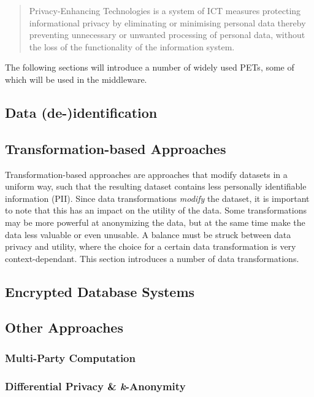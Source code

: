 \begin{quote}{\citeauthor{pets-handbook}}
    Privacy-Enhancing Technologies is a system of ICT measures protecting informational privacy by eliminating or minimising personal data thereby preventing unnecessary or unwanted processing of personal data, without the loss of the functionality of the information system.
\end{quote} 


The following sections will introduce a number of widely used PETs, some of which will be used in the middleware.

\subsection{Data (de-)identification}

\subsection{Transformation-based Approaches}
Transformation-based approaches are approaches that modify datasets in a uniform way, such that the resulting dataset contains less personally identifiable information (PII). Since data transformations \textit{modify} the dataset, it is important to note that this has an impact on the utility of the data. Some transformations may be more powerful at anonymizing the data, but at the same time make the data less valuable or even unusable. A balance must be struck between data privacy and utility, where the choice for a certain data transformation is very context-dependant. This section introduces a number of data transformations.

\subsection{Encrypted Database Systems}
\subsection{Other Approaches}
\subsubsection{Multi-Party Computation}
\subsubsection{Differential Privacy \& \textit{k}-Anonymity}
\label{sec:pets}